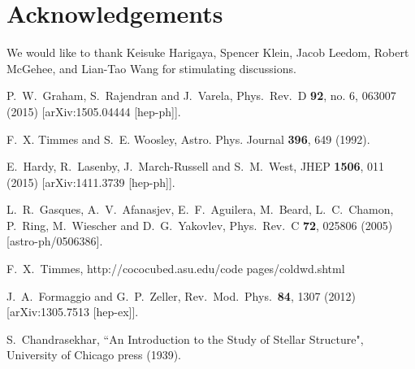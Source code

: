 \documentclass[twocolumn,preprintnumbers,amsmath,amssymb,prl, superscriptaddress]{revtex4}
\begin{document}
\section*{Acknowledgements}
We would like to thank Keisuke Harigaya, Spencer Klein, Jacob Leedom, Robert McGehee, and Lian-Tao Wang for stimulating discussions.

\begin{thebibliography}{99}
 

  P.~W.~Graham, S.~Rajendran and J.~Varela,
  Phys.\ Rev.\ D {\bf 92}, no. 6, 063007 (2015)
  [arXiv:1505.04444 [hep-ph]].


 F.~X. Timmes and S.~E. Woosley, Astro. Phys. Journal {\bf 396}, 649 (1992).

  E.~Hardy, R.~Lasenby, J.~March-Russell and S.~M.~West,
  JHEP {\bf 1506}, 011 (2015)
  [arXiv:1411.3739 [hep-ph]].


  L.~R.~Gasques, A.~V.~Afanasjev, E.~F.~Aguilera, M.~Beard, L.~C.~Chamon, P.~Ring, M.~Wiescher and D.~G.~Yakovlev,
  Phys.\ Rev.\ C {\bf 72}, 025806 (2005)
  [astro-ph/0506386].


F.~X.~Timmes, http://cococubed.asu.edu/code pages/coldwd.shtml

  J.~A.~Formaggio and G.~P.~Zeller,
  Rev.\ Mod.\ Phys.\  {\bf 84}, 1307 (2012)
  [arXiv:1305.7513 [hep-ex]].


S.~Chandrasekhar, ``An Introduction to the Study of Stellar Structure", University of Chicago press (1939).


\end{thebibliography}
\end{document}
